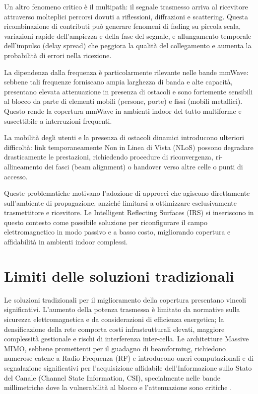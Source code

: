 \documentclass[12pt,a4paper]{report}
\begin{document}
Un altro fenomeno critico è il multipath: il segnale trasmesso arriva
al ricevitore attraverso molteplici percorsi dovuti a riflessioni,
diffrazioni e scattering. Questa ricombinazione di contributi può
generare fenomeni di fading su piccola scala, variazioni rapide
dell'ampiezza e della fase del segnale, e allungamento temporale
dell'impulso (delay spread) che peggiora la qualità del collegamento
e aumenta la probabilità di errori nella ricezione.

La dipendenza dalla frequenza è particolarmente rilevante nelle bande
mmWave: sebbene tali frequenze forniscano ampia larghezza di banda e
alte capacità, presentano elevata attenuazione in presenza di
ostacoli e sono fortemente sensibili al blocco da parte di elementi
mobili (persone, porte) e fissi (mobili metallici). Questo rende la
copertura mmWave in ambienti indoor del tutto multiforme e
suscettibile a interruzioni frequenti.

La mobilità degli utenti e la presenza di ostacoli dinamici
introducono ulteriori difficoltà: link temporaneamente Non in Linea
di Vista (NLoS) possono degradare drasticamente le prestazioni,
richiedendo procedure di riconvergenza, ri-allineamento dei fasci
(beam alignment) o handover verso altre celle o punti di accesso.

Queste problematiche motivano l'adozione di approcci che agiscono
direttamente sull'ambiente di propagazione, anziché limitarsi a
ottimizzare esclusivamente trasmettitore e ricevitore. Le Intelligent
Reflecting Surfaces (IRS) si inseriscono in questo contesto come
possibile soluzione per riconfigurare il campo elettromagnetico in
modo passivo e a basso costo, migliorando copertura e affidabilità in
ambienti indoor complessi. \cite{itu_p1238_2025}

\section{Limiti delle soluzioni tradizionali}
Le soluzioni tradizionali per il miglioramento della copertura
presentano vincoli significativi. L'aumento della potenza trasmessa è
limitato da normative sulla sicurezza elettromagnetica e da
considerazioni di efficienza energetica; la densificazione della rete
comporta costi infrastrutturali elevati, maggiore complessità
gestionale e rischi di interferenza inter-cella. Le architetture
Massive MIMO, sebbene promettenti per il guadagno di beamforming,
richiedono numerose catene a Radio Frequenza (RF) e introducono oneri
computazionali e di segnalazione significativi per l'acquisizione
affidabile dell'Informazione sullo Stato del Canale (Channel State
Information, CSI), specialmente nelle bande millimetriche dove la
vulnerabilità al blocco e l'attenuazione sono critiche
\cite{3gpp_tr38901,itu_m2410_2017,itu_p1238_2025}.
\end{document}

